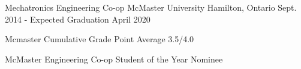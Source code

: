 
\begin{cventries}

  \cventry
    {Mechatronics Engineering Co-op} %
    {McMaster University} %
    {Hamilton, Ontario} %
    {Sept. 2014 - Expected Graduation April 2020} %
    {
      \begin{cvitems} %
        \item {Mcmaster Cumulative Grade Point Average 3.5/4.0}
        \item {McMaster Engineering Co-op Student of the Year Nominee}
      \end{cvitems}
    }



\end{cventries}
